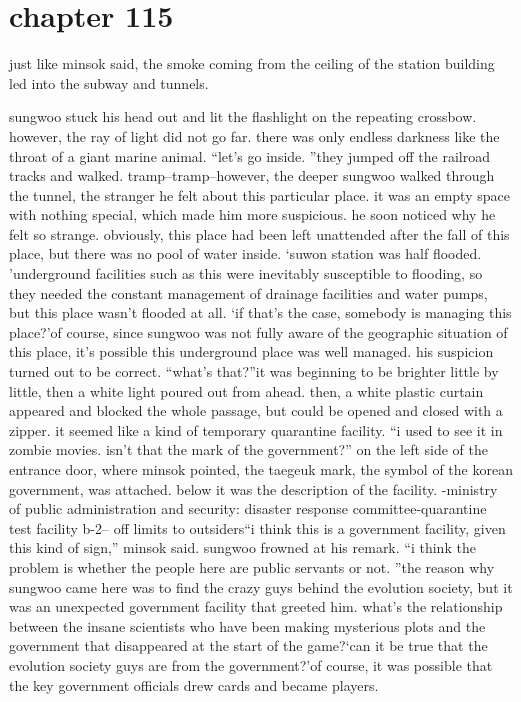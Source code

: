 \section{chapter 115}

                            just like minsok said, the smoke coming from the ceiling of the station building led into the subway and tunnels.





sungwoo stuck his head out and lit the flashlight on the repeating crossbow.
 however, the ray of light did not go far.
 there was only endless darkness like the throat of a giant marine animal.
“let’s go inside.
”they jumped off the railroad tracks and walked.
tramp–tramp–however, the deeper sungwoo walked through the tunnel, the stranger he felt about this particular place.
 it was an empty space with nothing special, which made him more suspicious.
he soon noticed why he felt so strange.
 obviously, this place had been left unattended after the fall of this place, but there was no pool of water inside.
‘suwon station was half flooded.
’underground facilities such as this were inevitably susceptible to flooding, so they needed the constant management of drainage facilities and water pumps, but this place wasn’t flooded at all.
‘if that’s the case, somebody is managing this place?’of course, since sungwoo was not fully aware of the geographic situation of this place, it’s possible this underground place was well managed.
his suspicion turned out to be correct.
“what’s that?”it was beginning to be brighter little by little, then a white light poured out from ahead.
then, a white plastic curtain appeared and blocked the whole passage, but could be opened and closed with a zipper.
 it seemed like a kind of temporary quarantine facility.
“i used to see it in zombie movies.
 isn’t that the mark of the government?”
on the left side of the entrance door, where minsok pointed, the taegeuk mark, the symbol of the korean government, was attached.
 below it was the description of the facility.
-ministry of public administration and security: disaster response committee-quarantine test facility b-2– off limits to outsiders“i think this is a government facility, given this kind of sign,” minsok said.
sungwoo frowned at his remark.
“i think the problem is whether the people here are public servants or not.
”the reason why sungwoo came here was to find the crazy guys behind the evolution society, but it was an unexpected government facility that greeted him.
what’s the relationship between the insane scientists who have been making mysterious plots and the government that disappeared at the start of the game?‘can it be true that the evolution society guys are from the government?’of course, it was possible that the key government officials drew cards and became players.
